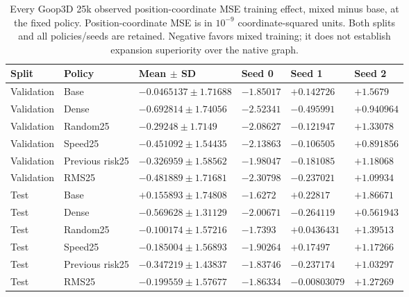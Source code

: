 \begin{table}[p]
\centering\scriptsize
\caption{Every Goop3D 25k observed position-coordinate MSE training effect, mixed minus base, at the fixed policy. Position-coordinate MSE is in $10^{-9}$ coordinate-squared units. Both splits and all policies/seeds are retained. Negative favors mixed training; it does not establish expansion superiority over the native graph.}
\label{tab:goop3d25k-observed-position-training}
\setlength{\tabcolsep}{3pt}
\begin{tabular}{llllll}
\toprule
Split & Policy & Mean $\pm$ SD & Seed 0 & Seed 1 & Seed 2\\
\midrule
Validation & Base & $-0.0465137\pm1.71688$ & $-1.85017$ & $+0.142726$ & $+1.5679$\\
Validation & Dense & $-0.692814\pm1.74056$ & $-2.52341$ & $-0.495991$ & $+0.940964$\\
Validation & Random25 & $-0.29248\pm1.7149$ & $-2.08627$ & $-0.121947$ & $+1.33078$\\
Validation & Speed25 & $-0.451092\pm1.54435$ & $-2.13863$ & $-0.106505$ & $+0.891856$\\
Validation & Previous risk25 & $-0.326959\pm1.58562$ & $-1.98047$ & $-0.181085$ & $+1.18068$\\
Validation & RMS25 & $-0.481889\pm1.71681$ & $-2.30798$ & $-0.237021$ & $+1.09934$\\
Test & Base & $+0.155893\pm1.74808$ & $-1.6272$ & $+0.22817$ & $+1.86671$\\
Test & Dense & $-0.569628\pm1.31129$ & $-2.00671$ & $-0.264119$ & $+0.561943$\\
Test & Random25 & $-0.100174\pm1.57216$ & $-1.7393$ & $+0.0436431$ & $+1.39513$\\
Test & Speed25 & $-0.185004\pm1.56893$ & $-1.90264$ & $+0.17497$ & $+1.17266$\\
Test & Previous risk25 & $-0.347219\pm1.43837$ & $-1.83746$ & $-0.237174$ & $+1.03297$\\
Test & RMS25 & $-0.199559\pm1.57677$ & $-1.86334$ & $-0.00803079$ & $+1.27269$\\
\bottomrule
\end{tabular}
\end{table}


